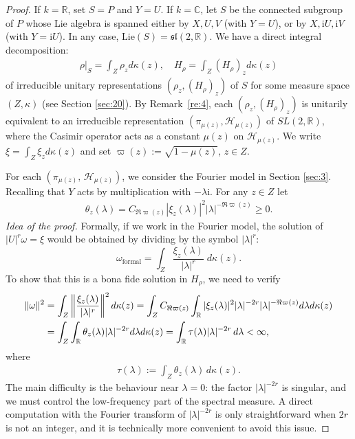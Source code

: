\documentclass[11 pt]{amsart}
\newcommand{\RR}{\mathbb{R}}
\newcommand{\R}{\mathbb{R}}
\newcommand{\CC}{\mathbb{C}}
\newcommand{\norm}[1]{\lVert#1\rVert}
\theoremstyle{definition}
\numberwithin{equation}{section}
\def\Lie{\mathrm{Lie}}
\begin{document}
\begin{proof} If $k=\RR$, set $S=P$ and $Y=U$. If $k=\CC$, let $S$ be the connected
subgroup of $P$ whose Lie algebra is spanned either by $X,U,V$ (with $Y=U$),
or by $X,\mathrm{i}U,\mathrm{i}V$ (with $Y=\mathrm{i}U$). In any case,
$\Lie(S)=\mathfrak{sl}(2,\RR)$. We have a direct integral decomposition:
\begin{align*}
  \rho|_{S}=\int_Z \rho_z d\kappa(z),\quad H_\rho=\int_Z (H_\rho)_z d\kappa(z)
\end{align*}
of irreducible unitary representations $(\rho_z,(H_\rho)_z)$ of $S$ for some measure space $(Z,\kappa)$ (see Section \ref{sec:20}). By
Remark~\ref{re:4}, each $(\rho_z,(H_\rho)_z)$ is unitarily equivalent to an
irreducible representation $(\pi_{\mu(z)},\mathcal{H}_{\mu(z)})$ of
$SL(2,\RR)$, where the Casimir operator acts as a constant $\mu(z)$ on
$\mathcal{H}_{\mu(z)}$. We write $\xi=\int_Z\xi_zd\kappa(z)$ and set $\varpi(z) := \sqrt{1 - \mu(z)}$, $z\in Z$.

For each $(\pi_{\mu(z)},\,\mathcal{H}_{\mu(z)})$, we consider the Fourier model in Section \ref{sec:3}.  Recalling that $Y$ acts by multiplication with $-\lambda\mathrm{i}$.
For any $z\in Z$ let
\begin{align}\label{for:284}
 \theta_z(\lambda)=C_{\Re\varpi(z)}|\xi_z(\lambda)|^2 \vert \lambda\vert^{-\Re\varpi(z)}\geq0.
\end{align}
\emph{Idea of the proof.}
Formally, if we work in the Fourier model, the solution of
\(|U|^r\omega=\xi\) would be obtained by dividing by the symbol
\(|\lambda|^r\):
\[
 \omega_{\text{formal}}=\int_Z \frac{\xi_z(\lambda)}{|\lambda|^{r}}\;d\kappa(z).
\]
To show that this is a bona fide solution in $H_\rho$, we need to verify
\begin{align}\label{for:239}
  \norm{\omega}^2&=  \int_Z \left\|\frac{\xi_z(\lambda)}{|\lambda|^{r}}\right\|^2 d\kappa(z)=\int_Z C_{\Re\varpi(z)} \int_{\R} |\xi_z(\lambda)|^2|\lambda|^{-2r} \vert \lambda\vert^{-\Re\varpi(z)} d\lambda d\kappa(z)\notag\\
  &=\int_Z\int_{\R}\theta_z(\lambda)|\lambda|^{-2r}d\lambda d\kappa(z)=\int_{\mathbb R}\tau(\lambda)|\lambda|^{-2r}\,d\lambda<\infty,
\end{align}
where
\begin{align}\label{for:285}
\tau(\lambda):=\int_Z\theta_z(\lambda)\,d\kappa(z).
\end{align}
The main difficulty is the behaviour near $\lambda=0$: the factor
\(|\lambda|^{-2r}\) is singular, and we must control the low-frequency
part of the spectral measure. A direct computation with the Fourier transform
of \(|\lambda|^{-2r}\) is only straightforward when $2r$ is not an integer, and
it is technically more convenient to avoid this issue.


\end{proof}
\end{document}
